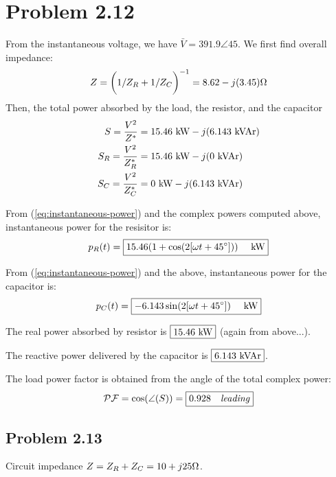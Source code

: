 \documentclass{homework}
\begin{document}
\section{Problem 2.12}
From the instantaneous voltage, we have $\bar{V} = 391.9 \angle 45$.
We first find overall impedance:
\begin{equation*}
    Z = \biggl(1/Z_R + 1/Z_C\biggr)^{-1} = 8.62 - j (3.45) \ohm
\end{equation*}
Then, the total power absorbed by the load, the resistor,
and the capacitor
\begin{align*}
    S = \frac{V^2}{Z^*} &= 15.46 \text{ kW} - j (6.143 \text{ kVAr}) \\
    S_R = \frac{V^2}{Z_R^*} &= 15.46 \text{ kW} - j (0 \text{ kVAr}) \\
    S_C = \frac{V^2}{Z_C^*} &= 0 \text{ kW} - j (6.143 \text{ kVAr})
\end{align*}


\begin{letterenum}
    \item From (\ref{eq:instantaneous-power}) and the complex
        powers computed above,
        instantaneous power for the resisitor is:
    \begin{equation*}
        p_R(t) = \boxed{15.46 (1 + \cos(2[\omega t + 45 \degree])) \quad \text{ kW}}
    \end{equation*}
    \item From (\ref{eq:instantaneous-power}) and the above,
        instantaneous power for the capacitor is:
    \begin{equation*}
        p_C(t) = \boxed{-6.143 \sin(2[\omega t + 45 \degree]) \quad \text{ kW}}
    \end{equation*}
    \item The real power absorbed by resistor is $\boxed{$15.46 kW$}$
        (again from above...).
    \item The reactive power delivered by the capacitor is
        $\boxed{$6.143 kVAr$}$.
    \item The load power factor is obtained from the angle of the
        total complex power:
        \begin{equation*}
            \mathcal{PF} = \cos(\angle(S)) = \boxed{0.928 \quad \it{ leading}}
        \end{equation*}
\end{letterenum}

\subsection{Problem 2.13}
Circuit impedance $Z = Z_R + Z_C = 10 + j25 \ohm$.
\end{document}
